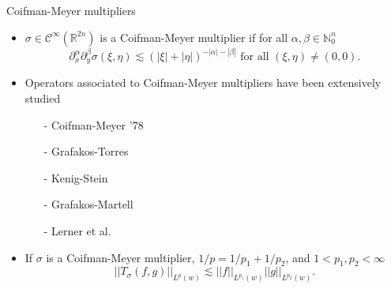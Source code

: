 \documentclass[xcolor=dvipsnames]{beamer}
\newcommand{\fr}[2]{{\textstyle \frac{#1}{#2}}}
\newcommand{\norm}[2]{{\left\| #1 \right\|}_{#2}}
\newcommand{\N}{\mathbb N}
\newcommand{\hcline}{1/p=1/p_1+1/p_2}
\begin{document}
\begin{frame}{Coifman-Meyer multipliers}
\begin{itemize}
\item $\sigma \in \mathcal{C}^\infty(\mathbb{R}^{2n})$ is a Coifman-Meyer multiplier if for all $\alpha,\beta \in \mathbb{N}^n_0$ 
\[ \partial^\alpha_x \partial^\beta_y \sigma(\xi,\eta) \lesssim (|\xi| + |\eta|)^{-|\alpha| - |\beta|} \text{ for all } (\xi,\eta)\neq (0,0). \]

\bigskip
\item Operators associated to Coifman-Meyer multipliers have been extensively studied
\begin{enumerate}[-]
\item[-] Coifman-Meyer '78
\item[-] Grafakos-Torres
\item[-] Kenig-Stein
\item[-] Grafakos-Martell
\item[-]Lerner et al.

\end{enumerate}
\item If $\sigma$ is a Coifman-Meyer multiplier, $\hcline$, and $1<p_1,p_2<\infty$ \[||T_\sigma(f,g)||_{L^p(w)} \lesssim ||f||_{L^{p_1}(w)} ||g||_{L^{p_2}(w)}.\]
\end{itemize}

\end{frame}

%
%
%
%
%
\end{document}
